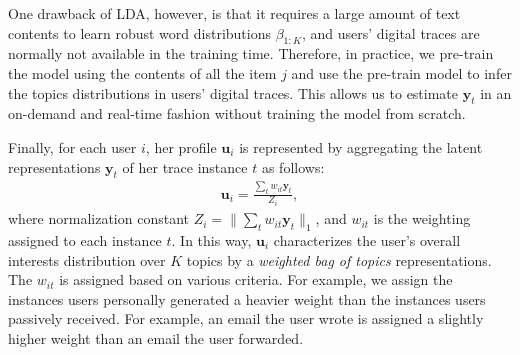 \documentclass[conference]{IEEEtran}
\begin{document}
One drawback of LDA, however, is that it requires a large amount of text contents to learn robust word distributions $\beta_{1:K}$, and users' digital traces are normally not available in the training time. Therefore, in practice, we pre-train the model using the contents of all the item $j$ and use the pre-train model to infer the topics distributions in users' digital traces. This allows us to estimate $\mathbf{y}_t$ in an on-demand and real-time fashion without training the model from scratch. 


Finally, for each user $i$, her profile $\mathbf{u}_i$ is represented by aggregating the latent representations $\mathbf{y}_t$ of her trace instance $t$ as follows:
\begin{eqnarray}\label{eq:u_i}
\mathbf{u}_i = \frac{\sum_{t} w_{it}\mathbf{y}_t}{Z_i},
\end{eqnarray}where normalization constant $Z_i=\|\sum_{t} w_{it} \mathbf{y}_t\|_{1}$, and $w_{it}$ is the weighting assigned to each instance $t$. In this way, $\mathbf{u}_i$ characterizes the user's overall interests distribution over $K$ topics by a \textit{weighted bag of topics} representations. The $w_{it}$ is assigned based on various criteria. For example, we assign the instances users personally generated a heavier weight than the instances users passively received. For example, an email the user wrote is assigned a slightly higher weight than an email the user forwarded. 
\end{document}
